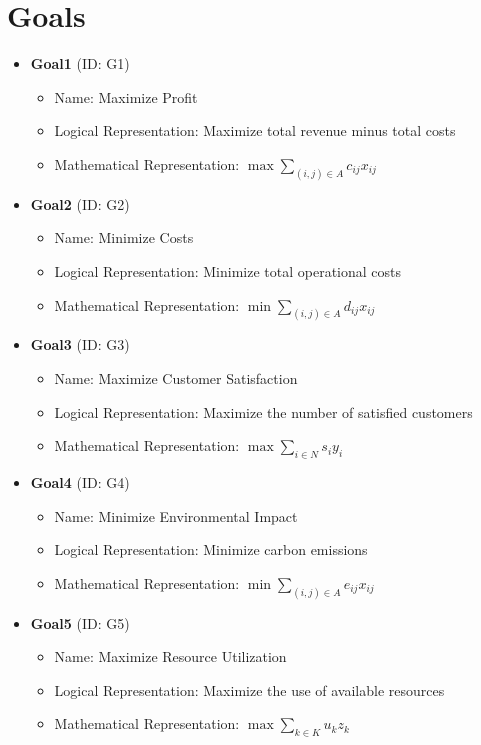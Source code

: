 \documentclass{article}
\begin{document}
\section{Goals}
\begin{itemize}
    \item \textbf{Goal1} (ID: G1)
    \begin{itemize}
        \item Name: Maximize Profit
        \item Logical Representation: Maximize total revenue minus total costs
        \item Mathematical Representation: $\max \sum_{(i,j) \in A} c_{ij}x_{ij}$
    \end{itemize}
    \item \textbf{Goal2} (ID: G2)
    \begin{itemize}
        \item Name: Minimize Costs
        \item Logical Representation: Minimize total operational costs
        \item Mathematical Representation: $\min \sum_{(i,j) \in A} d_{ij}x_{ij}$
    \end{itemize}
    \item \textbf{Goal3} (ID: G3)
    \begin{itemize}
        \item Name: Maximize Customer Satisfaction
        \item Logical Representation: Maximize the number of satisfied customers
        \item Mathematical Representation: $\max \sum_{i \in N} s_i y_i$
    \end{itemize}
    \item \textbf{Goal4} (ID: G4)
    \begin{itemize}
        \item Name: Minimize Environmental Impact
        \item Logical Representation: Minimize carbon emissions
        \item Mathematical Representation: $\min \sum_{(i,j) \in A} e_{ij}x_{ij}$
    \end{itemize}
    \item \textbf{Goal5} (ID: G5)
    \begin{itemize}
        \item Name: Maximize Resource Utilization
        \item Logical Representation: Maximize the use of available resources
        \item Mathematical Representation: $\max \sum_{k \in K} u_k z_k$
    \end{itemize}
\end{itemize}
\end{document}
